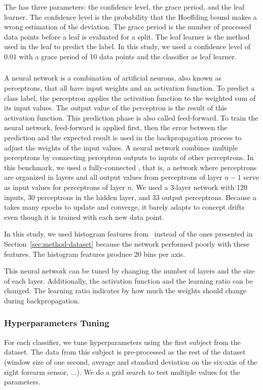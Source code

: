 The \hoeffdingtree has three parameters: the
confidence level, the grace period, and the leaf
learner. The confidence level is the probability that
the Hoeffding bound makes a wrong estimation of
the deviation. The grace period is the number of
processed data points before a leaf is evaluated for a split.
 The leaf learner is the method used in the
leaf to predict the label.  In this study, we used
a confidence level of $0.01$ with a grace period
of 10 data points and the \naivebayes classifier as leaf
learner.

\subsubsection{\FNN}
\label{sec:method-fnn}
A neural network is a combination of artificial
neurons, also known as perceptrons, that all have input weights and an
activation function. To predict a class label, the
perceptron applies the activation function to the weighted sum
of its input values. The output
value of the perceptron is the result of this
activation function. This prediction phase is also
called feed-forward. To train the neural network,
feed-forward is applied first, then the error between the
prediction and the expected result is used in the
backpropagation process to adjust the weights of
the input values.  A neural network combines
multiple perceptrons by connecting perceptron outputs
to inputs of other perceptrons.  In
this benchmark, we used a fully-connected \FNN, 
that is, a network where perceptrons are organized in
layers and all output
values from perceptrons of layer $n-1$ serve as
input values for perceptrons of layer $n$. 
We used a 3-layer network with 120 inputs, 30
perceptrons in the hidden layer, and 33 output
perceptrons.
Because a \FNN takes many epochs to update and
converge, it barely adapts to concept drifts even
though it is trained with each new data point.

In this study, we used histogram features
from~\cite{omid_2019} instead of the ones
presented in Section~\ref{sec:method-dataset}
because the network performed
poorly with these features. The histogram features
produce 20 bins per axis.

This neural network can be tuned by changing the
number of layers and the size of each layer.
Additionally, the activation function and the
learning ratio can be changed. The learning ratio
indicates by how much the weights should change
during backpropagation.

\subsubsection{Hyperparameters Tuning}
For each classifier, we tune hyperparameters  using the first subject from the
\banosdataset dataset.  The data from this subject is pre-processed as the rest
of the \banosdataset dataset (window size of one second, average and standard
deviation on the six-axis of the right forearm sensor, $\ldots$). We do a grid
search to test multiple values for the parameters.

